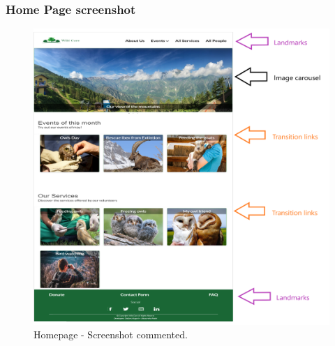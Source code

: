 \subsubsection{Home Page screenshot}
\begin{figure}[h!]
	\centering
	\begin{minipage}[b]{1\textwidth}
    		\includegraphics[width=\textwidth]{./assets/mockups/homepage_commented.png}
		\caption{Homepage - Screenshot commented.}
	\end{minipage}
\end{figure}
\FloatBarrier


